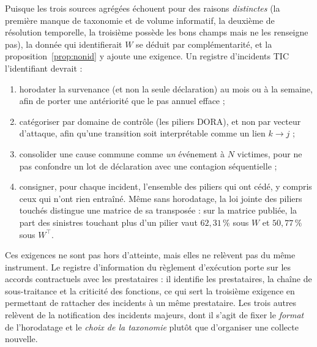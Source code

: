 Puisque les trois sources agrégées échouent pour des raisons \emph{distinctes} (la première
manque de taxonomie et de volume informatif, la deuxième de résolution temporelle, la troisième
possède les bons champs mais ne les renseigne pas), la donnée qui identifierait $W$ se déduit
par complémentarité, et la proposition~\ref{prop:nonid} y ajoute une exigence. Un registre
d'incidents TIC l'identifiant devrait :
\begin{enumerate}[itemsep=2pt]
\item horodater la survenance (et non la seule déclaration) au mois ou à la
      semaine, afin de porter une antériorité que le pas annuel efface ;
\item catégoriser par domaine de contrôle (les piliers DORA), et non par vecteur
      d'attaque, afin qu'une transition soit interprétable comme un lien $k \to j$ ;
\item consolider une cause commune comme \emph{un} événement à $N$ victimes, pour ne pas
      confondre un lot de déclaration avec une contagion séquentielle ;
\item consigner, pour chaque incident, l'ensemble des piliers qui ont cédé, y compris ceux qui
      n'ont rien entraîné. Même sans horodatage, la loi jointe des piliers touchés distingue une
      matrice de sa transposée : sur la matrice publiée, la part des sinistres touchant plus d'un
      pilier vaut $62{,}31\,\%$ sous $W$ et $50{,}77\,\%$ sous $W^\top$.
\end{enumerate}

Ces exigences ne sont pas hors d'atteinte, mais elles ne relèvent pas du même instrument. Le
registre d'information du règlement d'exécution \citep{eu2024_2956} porte sur les accords
contractuels avec les prestataires : il identifie les prestataires, la chaîne de sous-traitance et
la criticité des fonctions, ce qui sert la troisième exigence en permettant de rattacher des
incidents à un même prestataire. Les trois autres relèvent de la notification des incidents
majeurs, dont il s'agit de fixer le \emph{format} de l'horodatage et le \emph{choix de la
taxonomie} plutôt que d'organiser une collecte nouvelle.

